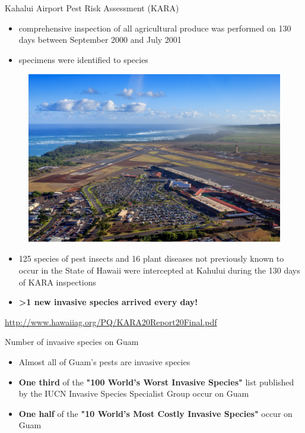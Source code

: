 \documentclass[]{beamer}
\begin{document}
\begin{frame}{Kahalui Airport Pest Risk Assessment (KARA)}
	\begin{itemize}
		\item comprehensive inspection of all agricultural produce was performed on 130 days between September 2000 and July 2001
		\item specimens were identified to species
	\end{itemize}
	\begin{figure}
		\includegraphics[height=0.35\textheight]{kahului-airport.jpg}
	\end{figure}
	\begin{itemize}
		\item 125 species of pest insects and 16 plant diseases not previously known to occur in the State of Hawaii were intercepted at Kahului during the 130 days of KARA inspections
		\item \textbf{>1 new invasive species arrived every day!}
	\end{itemize}
	\url{http://www.hawaiiag.org/PQ/KARA20Report20Final.pdf}
\end{frame}

\begin{frame}{Number of invasive species on Guam}
	\begin{itemize}
		\item Almost all of Guam's pests are invasive species
		\item \textbf{One third} of the \textbf{"100 World's Worst Invasive Species"} list published by the IUCN Invasive Species Specialist Group  occur on Guam
		\item \textbf{One half} of the \textbf{"10 World's Most Costly Invasive Species"} occur on Guam
	\end{itemize}
\end{frame}
\end{document}
